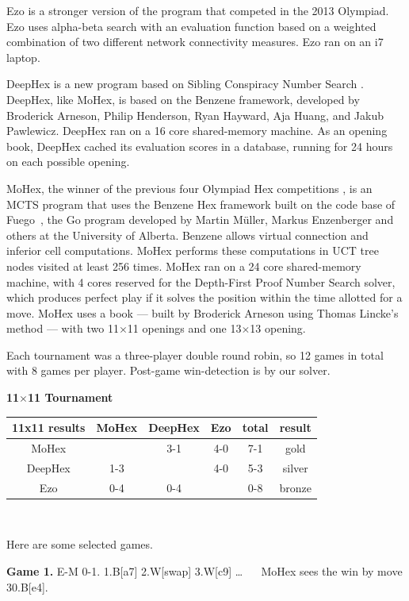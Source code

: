 \documentclass{icga}
\def\Dx{\mbox{\sc DeepHex}}
\def\Eo{\mbox{\sc Ezo}}
\def\Mx{\mbox{\sc MoHex}}
\def\Fuego{\mbox{\sc Fuego}}
\begin{document}
\Eo{} is a stronger version of the program that competed in the 2013 Olympiad.
\Eo{} uses alpha-beta search with an evaluation function based on
a weighted combination of two different network connectivity measures.
\Eo{} ran on an i7 laptop.

\Dx{} is a new program based on 
Sibling Conspiracy Number Search .
\Dx{}, like \Mx, is based on the Benzene framework, 
developed by Broderick Arneson, Philip Henderson, Ryan Hayward,
Aja Huang, and Jakub Pawlewicz.
\Dx{} ran on a 16 core shared-memory machine.
As an opening book, \Dx{} cached its evaluation scores in a database,
running for 24 hours on each possible opening.

\Mx{}, the winner of the previous four Olympiad Hex competitions
,
is an MCTS program that uses the Benzene Hex framework
built on the code base of \Fuego\ ,
the Go program developed by Martin M\"{u}ller, Markus Enzenberger
and others at the University of Alberta.
Benzene allows virtual connection and
inferior cell computations.
\Mx{} performs these computations in UCT tree nodes visited at least 256 times.
\Mx{} ran on a 24 core shared-memory machine, 
with 4 cores reserved for the 
Depth-First Proof Number Search solver, which
produces perfect play if it solves the
position within the time allotted for a move.
\Mx{} uses a book ---
built by Broderick Arneson using Thomas Lincke's method 
 ---
with two 11$\times$11 openings and one 13$\times$13 opening.

Each tournament was a three-player double round robin, so 12 games
in total with 8 games per player.
Post-game win-detection is by our solver.

{\large\bf 11$\times$11 Tournament}

\hfill\begin{tabular}{|c|c|c|c|c|c|}
\hline 11x11 results &\Mx{} &\Dx{}    & \Eo{}     & total & result \\ 
\hline \Mx{} &      &  3-1    &  4-0      & 7-1  & gold \\
\hline \Dx{} &  1-3 &         &  4-0      & 5-3  &  silver\\
\hline \Eo{} &  0-4 &  0-4    &           & 0-8  &  bronze \\
\hline
\end{tabular}\hfill~

Here are some selected games.

{\bf Game 1.}
{\sc E-M 0-1.}
1.B[a7] 2.W[swap] 3.W[c9] \ldots ~ ~
\Mx{} sees the win by move 30.B[e4].
\end{document}
